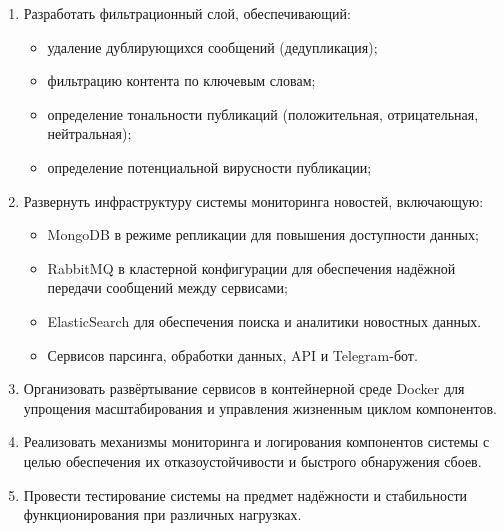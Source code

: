 \begin{enumerate}
\def\labelenumi{\arabic{enumi}.}
\tightlist
\item
  Разработать фильтрационный слой, обеспечивающий:

  \begin{itemize}
  \tightlist
  \item
    удаление дублирующихся сообщений (дедупликация);\\
  \item
    фильтрацию контента по ключевым словам;\\
  \item
    определение тональности публикаций (положительная, отрицательная,
    нейтральная);\\
  \item
    определение потенциальной вирусности публикации;\\
  \end{itemize}
\item
  Развернуть инфраструктуру системы мониторинга новостей, включающую:

  \begin{itemize}
  \tightlist
  \item
    MongoDB в режиме репликации для повышения доступности данных;\\
  \item
    RabbitMQ в кластерной конфигурации для обеспечения надёжной передачи
    сообщений между сервисами;\\
  \item
    ElasticSearch для обеспечения поиска и аналитики новостных данных.\\
  \item
    Сервисов парсинга, обработки данных, API и Telegram-бот.\\
  \end{itemize}
\item
  Организовать развёртывание сервисов в контейнерной среде Docker для
  упрощения масштабирования и управления жизненным циклом компонентов.\\
\item
  Реализовать механизмы мониторинга и логирования компонентов системы с
  целью обеспечения их отказоустойчивости и быстрого обнаружения
  сбоев.\\
\item
  Провести тестирование системы на предмет надёжности и стабильности
  функционирования при различных нагрузках.
\end{enumerate}

